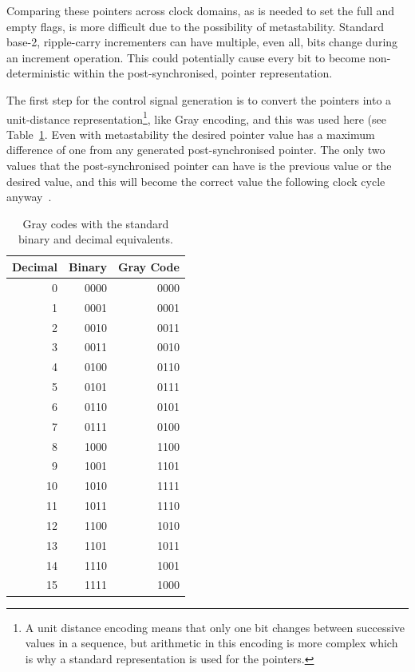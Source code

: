 Comparing these pointers across clock domains, as is needed to set the
full and empty flags, is more difficult due to the possibility of
metastability. Standard base-2, ripple-carry incrementers can have multiple,
even all, bits change during an increment operation. This could potentially
cause every bit to become non-deterministic within the post-synchronised,
pointer representation.

The first step for the control signal generation is to convert the pointers into
a unit-distance representation\footnote{A unit distance encoding means that only one
bit changes between successive values in a sequence, but arithmetic in this
encoding is more complex which is why a standard representation is used for the
pointers.}, like Gray encoding, and this was used here (see
Table~\ref{CLOCK_Gray_Codes}. Even with metastability the desired pointer value
has a maximum difference of one from any generated post-synchronised pointer.
The only two values that the post-synchronised pointer can have is the previous
value or the desired value, and this will become the correct value the
following clock cycle anyway~\cite{Async_FIFO, Async_FIFO2}.

\begin{table}
\begin{center}
\begin{tabular}{| r || r | r |}
\hline
Decimal & Binary & Gray Code \\
\hline
0 & 0000 & 0000 \\
1 & 0001 & 0001 \\
2 & 0010 & 0011 \\
3 & 0011 & 0010 \\
4 & 0100 & 0110 \\
5 & 0101 & 0111 \\
6 & 0110 & 0101 \\
7 & 0111 & 0100 \\
8 & 1000 & 1100 \\
9 & 1001 & 1101 \\
10 & 1010 & 1111 \\
11 & 1011 & 1110 \\
12 & 1100 & 1010 \\
13 & 1101 & 1011 \\
14 & 1110 & 1001 \\
15 & 1111 & 1000 \\
\hline
\end{tabular}
\caption[Comparison of Decimal, Binary, and Gray Encoding.]{Gray codes with the
standard binary and decimal equivalents.}
\label{CLOCK_Gray_Codes}
\end{center}
\end{table}


